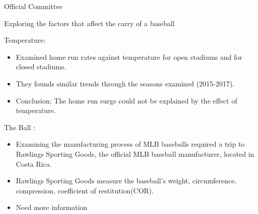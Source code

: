 \documentclass[14pt]{bredelebeamer}
\begin{document}
\begin{frame}{Official Committee}

\begin{block}{Exploring the factors that affect the carry of a baseball}

Temperature:
  \begin{itemize}
    \item Examined home run rates against temperature for 		open stadiums and for closed stadiums. 
    \item They founds similar trends through the seasons 		examined (2015-2017).
    \item Conclusion: The home run surge could not be 		explained by the effect of temperature.
  \end{itemize}

The Ball :
  \begin{itemize}
    \item Examining the manufacturing process of MLB 		baseballs required a trip to Rawlings Sporting Goods, 		the official MLB baseball manufacturer, located in 		Costa Rica.
    \item Rawlings Sporting Goods measure the baseball's 		weight, circumference, compression, coefficient of 		restitution(COR).
    \item Need more information
  \end{itemize}
\end{block}
\end{frame}
\end{document}
